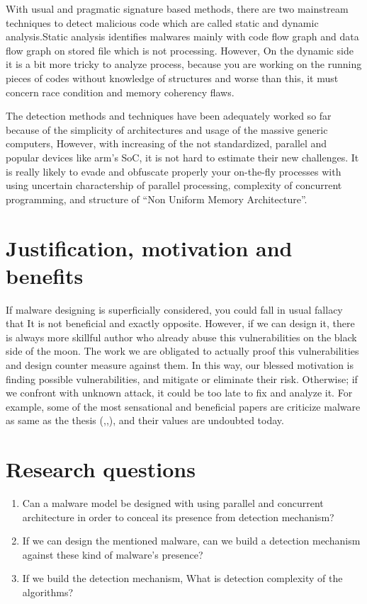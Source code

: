 \documentclass[informationsecurity]{gucmasterproject}
\begin{document}
With usual and pragmatic signature based methods, there are two mainstream techniques to detect malicious code which are called static and dynamic analysis.Static analysis identifies malwares mainly with code flow graph and data flow graph on stored file which is not processing. However, On the dynamic side it is a bit more tricky to analyze process, because you are working on the running pieces of codes without knowledge of structures and worse than this, it must concern race condition and memory coherency flaws. 

The detection methods and techniques have been adequately worked so far because of the simplicity of architectures and usage of the massive generic computers, However, with increasing of the not standardized, parallel and popular devices like arm’s SoC, it is not hard to estimate their new challenges. It is really likely to evade and obfuscate properly your on-the-fly processes with using uncertain charactership of parallel processing, complexity of concurrent programming, and structure of “Non Uniform Memory Architecture”.


\section{Justification, motivation and benefits}
If malware designing is superficially considered, you could fall in usual fallacy that It is not beneficial and exactly opposite. However, if we can design it, there is always more skillful author who already abuse this vulnerabilities on the black side of the moon. The work we are obligated to actually proof this vulnerabilities and design counter measure against them. In this way, our blessed motivation is finding possible vulnerabilities, and mitigate or eliminate their risk. Otherwise; if we confront with unknown attack, it could be too late to fix and analyze it. For example, some of the most sensational and beneficial papers are criticize malware as same as the thesis (\cite{moser2007limits},\cite{cavallaro2008limits},\cite{egele2012survey}), and their values are undoubted today. 

\section{Research questions}\label{research:questions}

\begin{enumerate}
\item Can a malware model be designed with using parallel and concurrent architecture in order to conceal its presence from detection mechanism?
\item If we can design the mentioned malware, can we build a detection mechanism against these kind of malware's presence?
\item If we build the detection mechanism, What is detection complexity of the algorithms?
\end{enumerate}
\end{document}
